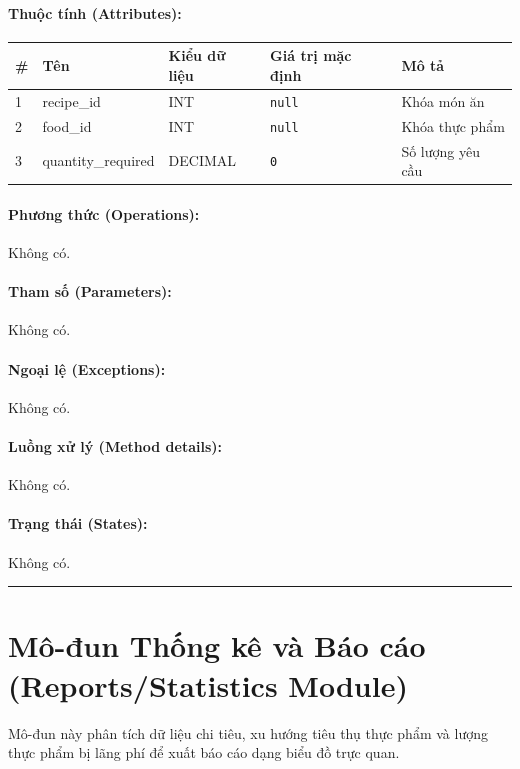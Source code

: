 \documentclass[12pt,a4paper]{article}
\begin{document}
\paragraph{Thuộc tính (Attributes):}
\begin{longtable}{|p{0.6cm}|p{2.8cm}|p{2.2cm}|p{1.8cm}|p{5.8cm}|}
\hline
\textbf{\#} & \textbf{Tên} & \textbf{Kiểu dữ liệu} & \textbf{Giá trị mặc định} & \textbf{Mô tả} \\ \hline
\endhead
1 & recipe\_id & INT & \texttt{null} & Khóa món ăn \\ \hline
2 & food\_id & INT & \texttt{null} & Khóa thực phẩm \\ \hline
3 & quantity\_required & DECIMAL & \texttt{0} & Số lượng yêu cầu \\ \hline
\end{longtable}

\paragraph{Phương thức (Operations):}
Không có.

\paragraph{Tham số (Parameters):}
Không có.

\paragraph{Ngoại lệ (Exceptions):}
Không có.

\paragraph{Luồng xử lý (Method details):}
Không có.

\paragraph{Trạng thái (States):}
Không có.

\vskip 0.5cm
\noindent\rule{\textwidth}{0.5pt}
\vskip 0.5cm

\section{Mô-đun Thống kê và Báo cáo (Reports/Statistics Module)}

Mô-đun này phân tích dữ liệu chi tiêu, xu hướng tiêu thụ thực phẩm và lượng thực phẩm bị lãng phí để xuất báo cáo dạng biểu đồ trực quan.
\end{document}
